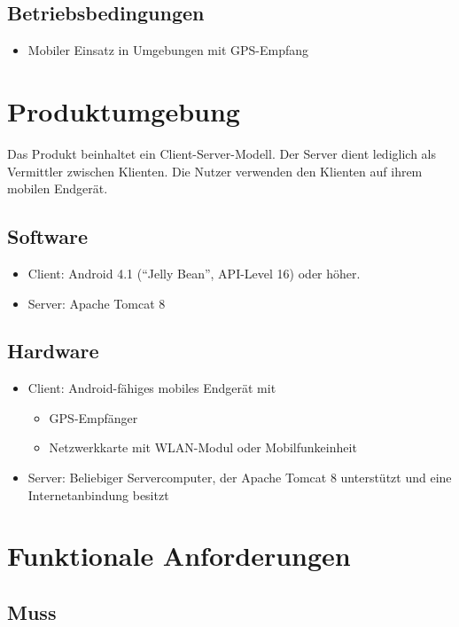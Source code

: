\documentclass[parskip=full,11pt]{scrartcl}
\begin{document}
\subsection{Betriebsbedingungen}
\begin{itemize}
    \item Mobiler Einsatz in Umgebungen mit GPS-Empfang
\end{itemize}

\section{Produktumgebung}
Das Produkt beinhaltet ein Client-Server-Modell.
Der Server dient lediglich als Vermittler zwischen Klienten.
Die Nutzer verwenden den Klienten auf ihrem mobilen Endgerät.
\subsection{Software}
\begin{itemize}
    \item Client: Android 4.1 (\enquote{Jelly Bean}, API-Level 16) oder
        höher.
    \item Server: Apache Tomcat 8
\end{itemize}

\subsection{Hardware}
\begin{itemize}
    \item Client: Android-fähiges mobiles Endgerät mit
        \begin{itemize}
            \item GPS-Empfänger
            \item Netzwerkkarte mit WLAN-Modul oder Mobilfunkeinheit
        \end{itemize}
    \item Server: Beliebiger Servercomputer, der Apache Tomcat 8 unterstützt
        und eine Internetanbindung besitzt
\end{itemize}

\section{Funktionale Anforderungen}
\subsection{Muss}
\end{document}
